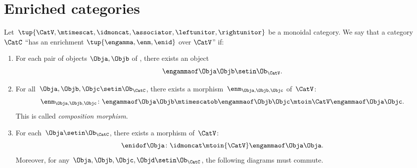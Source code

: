
\section{Enriched categories}
\label{sec:enrichment-enriched-categories}

\begin{ctdefinition}
    \label{def:enriched_cat}
    Let~$\tup{\CatV,\mtimescat, \idmoncat, \associator, \leftunitor,\rightunitor}$ be a monoidal category.
    We say that a category $\CatC$ ``has an enrichment $\tup{\engamma,\enm,\enid}$ over $\CatV$'' if:
    \begin{enumerate}
        \item For each pair of objects $\Obja,\Objb$ of \CatC, there exists an object
              \begin{equation}
                  \engammaof\Obja\Objb \setin \Ob_{\CatV}.
              \end{equation}
        \item For all~$\Obja, \Objb, \Objc\setin \Ob_\CatC$, there exists a morphism~$\enm_{\Obja,\Objb,\Objc}$ of~$\CatV$:
              \begin{equation}
                  \enm_{\Obja,\Objb,\Objc}\colon \engammaof\Obja\Objb \mtimescatob \engammaof\Objb\Objc \mtoin\CatV \engammaof\Obja\Objc.
              \end{equation}
              This is called \emph{composition morphism}.
        \item For each~$\Obja\setin \Ob_\CatC$, there exists a morphism of~$\CatV$:
              \begin{equation}
                  \enidof\Obja \colon \idmoncat \mtoin{\CatV} \engammaof\Obja\Obja.
              \end{equation}
              Moreover, for any~$\Obja,\Objb,\Objc,\Objd\setin \Ob_\CatC$, the following diagrams must commute.
    \end{enumerate}
\end{ctdefinition}

